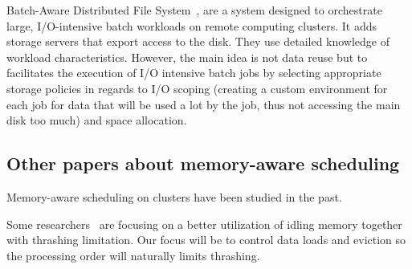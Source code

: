 \documentclass[conference,10pt]{IEEEtran}
\begin{document}
Batch-Aware Distributed File System~\cite{Explicit_Control_in_a_Batch-Aware_Distributed_File_System},
are a system designed to orchestrate large, I/O-intensive batch workloads on remote computing clusters.
It adds storage servers that export access to the disk.
They use detailed knowledge of workload characteristics.
However, the main idea is not data reuse but to
facilitates the execution of I/O intensive batch
jobs by selecting appropriate storage policies
in regards to I/O scoping (creating a custom environment for each job
for data that will be used a lot by the job, thus not accessing the main disk too
much) and space allocation.


\subsection{Other papers about memory-aware scheduling}
Memory-aware scheduling on clusters have been studied in the past.
 

Some researchers~\cite{Nikolopoulos2003AdaptiveSU}
are focusing on a better utilization of idling memory together with 
thrashing limitation. Our focus will be to control data loads and eviction so the
processing order will naturally limits thrashing.
\end{document}
